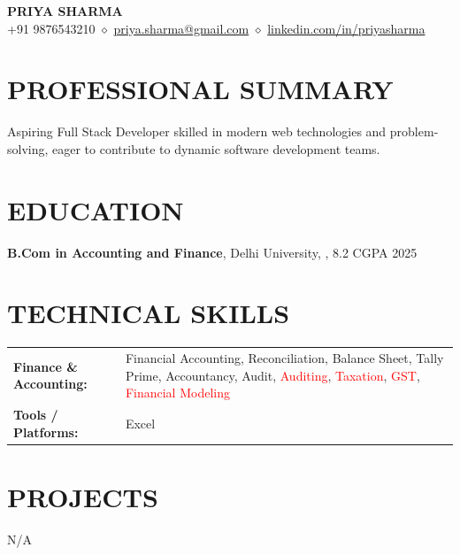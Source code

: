 \documentclass[9.5pt,a4paper]{extarticle}
\begin{document}
\begin{center}
{\Large \textbf{PRIYA SHARMA}} \\ \vspace{2pt}
+91 9876543210 $\diamond$ \href{mailto:priya.sharma@gmail.com}{priya.sharma@gmail.com} $\diamond$ \href{https://linkedin.com/in/priyasharma}{linkedin.com/in/priyasharma}
\end{center}

\section*{PROFESSIONAL SUMMARY}
Aspiring Full Stack Developer skilled in modern web technologies and problem-solving, eager to contribute to dynamic software development teams.

\section*{EDUCATION}
\noindent \textbf{B.Com in Accounting and Finance}, Delhi University, , 8.2 CGPA \hfill 2025 \\ \vspace{4pt}


\section*{TECHNICAL SKILLS}
\begin{tabular}{@{}p{2.3in}p{4.6in}@{}}
\textbf{Finance \& Accounting:} & Financial Accounting, Reconciliation, Balance Sheet, Tally Prime, Accountancy, Audit, \textcolor{red}{Auditing}, \textcolor{red}{Taxation}, \textcolor{red}{GST}, \textcolor{red}{Financial Modeling} \\
\textbf{Tools / Platforms:} & Excel \\
\end{tabular}



\section*{PROJECTS}
N/A


\end{document}
